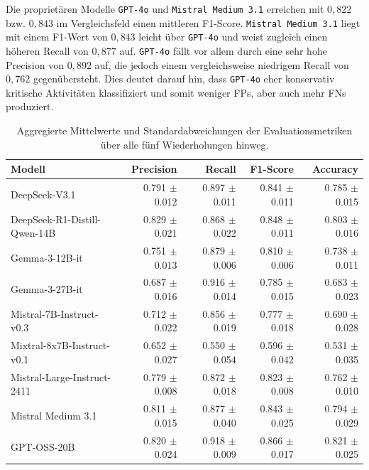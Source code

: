 Die proprietären Modelle \texttt{GPT-4o} und \texttt{Mistral Medium 3.1} erreichen mit $0{,}822$ bzw. $0{,}843$ im Vergleichsfeld einen mittleren F1-Score. \texttt{Mistral Medium 3.1} liegt mit
einem F1-Wert von $0{,}843$ leicht über \texttt{GPT-4o} und weist zugleich
einen höheren Recall von $0{,}877$ auf. \texttt{GPT-4o} fällt vor allem durch eine sehr hohe Precision von $0{,}892$ auf, die jedoch einem vergleichsweise niedrigem Recall von $0{,}762$ gegenübersteht. Dies deutet darauf hin, dass \texttt{GPT-4o} eher konservativ kritische Aktivitäten klassifiziert und somit weniger \acp{FP}, aber auch mehr \acp{FN} produziert.

\begin{table}[htbp]
    \centering
    \caption{Aggregierte Mittelwerte und Standardabweichungen der Evaluationsmetriken über alle fünf Wiederholungen hinweg.}
    \label{tab:metrics-overview}
    \begin{adjustbox}{width=\textwidth}
        \begin{tabular}{l r r r r}
            \toprule
            Modell                          & Precision         & Recall            & F1-Score          & Accuracy \\
            \midrule
            DeepSeek-V3.1                   & 0.791 $\pm$ 0.012 & 0.897 $\pm$ 0.011 & 0.841 $\pm$ 0.011 & 0.785 $\pm$ 0.015 \\
            DeepSeek-R1-Distill-Qwen-14B    & 0.829 $\pm$ 0.021 & 0.868 $\pm$ 0.022 & 0.848 $\pm$ 0.011 & 0.803 $\pm$ 0.016 \\
            Gemma-3-12B-it                  & 0.751 $\pm$ 0.013 & 0.879 $\pm$ 0.006 & 0.810 $\pm$ 0.006 & 0.738 $\pm$ 0.011 \\
            Gemma-3-27B-it                  & 0.687 $\pm$ 0.016 & 0.916 $\pm$ 0.014 & 0.785 $\pm$ 0.015 & 0.683 $\pm$ 0.023 \\
            Mistral-7B-Instruct-v0.3        & 0.712 $\pm$ 0.022 & 0.856 $\pm$ 0.019 & 0.777 $\pm$ 0.018 & 0.690 $\pm$ 0.028 \\
            Mixtral-8x7B-Instruct-v0.1      & 0.652 $\pm$ 0.027 & 0.550 $\pm$ 0.054 & 0.596 $\pm$ 0.042 & 0.531 $\pm$ 0.035 \\
            Mistral-Large-Instruct-2411     & 0.779 $\pm$ 0.008 & 0.872 $\pm$ 0.018 & 0.823 $\pm$ 0.008 & 0.762 $\pm$ 0.010 \\
            Mistral Medium 3.1              & 0.811 $\pm$ 0.015 & 0.877 $\pm$ 0.040 & 0.843 $\pm$ 0.025 & 0.794 $\pm$ 0.029 \\
            GPT-OSS-20B                     & 0.820 $\pm$ 0.024 & 0.918 $\pm$ 0.009 & 0.866 $\pm$ 0.017 & 0.821 $\pm$ 0.025 \\

\end{tabular}
\end{adjustbox}
\end{table}
